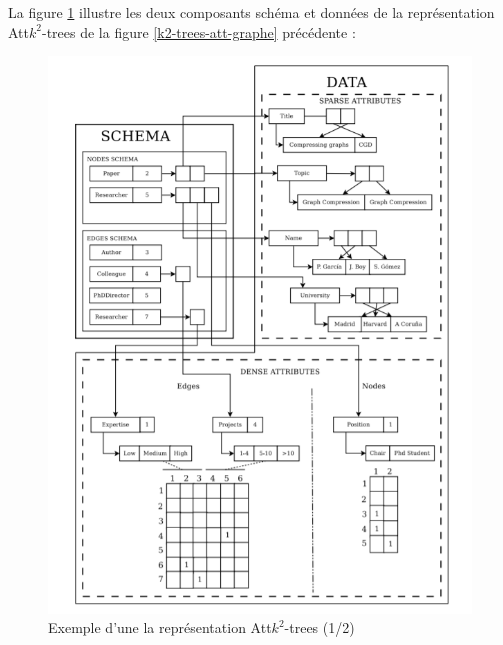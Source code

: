 \begin{itemize}
\begin{description}
\end{description}
La figure \ref{k2-trees-att-schema} illustre les deux composants schéma et données de la représentation Att$k^2$-trees  de la figure \ref{k2-trees-att-graphe} précédente \citep{alvarez2018compact}:
\begin{figure}[H]
\begin{center}
\includegraphics[height=200 pt, width=280 pt]{./ressources/image/k2-trees-att-schema.png} 
\end{center}
\caption{Exemple d'une la représentation Att$k^2$-trees (1/2)}
\label{k2-trees-att-schema}
\end{figure}



\end{itemize}

